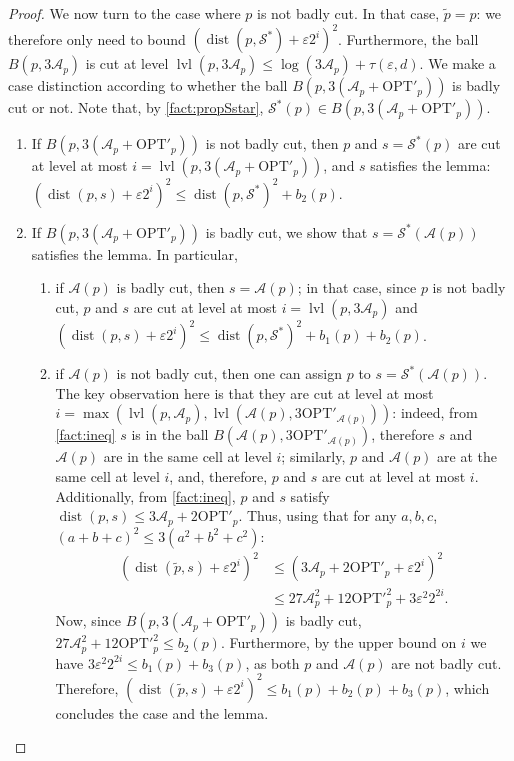 \documentclass[11pt]{article}
\newcommand{\opt}{\text{OPT}}
\newcommand{\eps}{\varepsilon}
\renewcommand{\tilde}{\widetilde}
\newcommand{\calS}{\mathcal {S}}
\newcommand{\calL}{\mathcal{A}}
\newcommand{\offset}{\tau(\eps, d)}
\DeclareMathOperator{\dist}{dist}
\newcommand{\lpar}{\left(}
\newcommand{\rpar}{\right)}
\DeclareMathOperator{\level}{lvl}
\begin{document}
\begin{proof}
 
 We now turn to the case where $p$ is not badly cut. In that case, $\tilde p = p$: we therefore only need to bound $\lpar \dist( p, \calS^*) + \eps 2^i\rpar^2$. 
 Furthermore, the ball $B(p, 3\calL_p)$ is cut at level $\level(p, 3\calL_p) \leq \log(3\calL_p)+\offset$. 
We make a case distinction according to whether the ball $B(p, 3(\calL_p + \opt'_p))$  is badly cut or not. Note that, by \cref{fact:propSstar}, $ \calS^*(p) \in B(p, 3(\calL_p + \opt'_p))$.
 \begin{enumerate}
  \item If $B(p, 3(\calL_p + \opt'_p))$ is not badly cut, then $p$ and $s = \calS^*(p)$ are cut at level at most $i = \level(p, 3(\calL_p + \opt'_p))$, and $s$ satisfies the lemma: $(\dist(p, s) + \eps 2^i)^2 \leq \dist(p, \calS^*)^2 + b_2(p)$.
  \item If $B(p, 3(\calL_p + \opt'_p))$ is badly cut, we show that $s= \calS^*(\calL(p))$ satisfies the lemma. In particular,
  \begin{enumerate}
      \item if $\calL(p)$ is badly cut, then $s = \calL(p)$; in that case, since $p$ is not badly cut, $p$ and $s$ are cut at level at most $i = \level(p, 3\calL_p)$ and $(\dist(p, s) + \eps 2^i)^2 \leq \dist(p, \calS^*)^2 + b_1(p) + b_2(p)$.
      \item if $\calL(p)$ is not badly cut, then one can assign $p$ to $s=\calS^*(\calL(p))$. The key observation here is that they are cut at level at most $i = \max\lpar \level(p, \calL_p), \level(\calL(p),  3\opt'_{\calL(p)}) \rpar$: indeed, from \cref{fact:ineq} $s$ is in the ball $B(\calL(p), 3\opt'_{\calL(p)})$, therefore $s$ and $\calL(p)$ are in the same cell at level $i$; similarly, $p$ and $\calL(p)$ are at the same cell at level $i$, and, therefore, $p$ and $s$ are cut at level at most $i$.  Additionally, from \cref{fact:ineq}, $p$ and $s$ satisfy $\dist(p, s) \leq 3\calL_p + 2\opt'_p$.    
 Thus, using that for any $a, b, c$, $(a+b+c)^2 \leq 3(a^2 + b^2 + c^2)$:
       \begin{align*}
           (\dist(\tilde p, s) + \eps 2^i)^2 &\leq 
           (3\calL_p + 2\opt'_p + \eps 2^i)^2\\
           &\leq 27 \calL_p^2 + 12 {\opt'}_p^2 + 3\eps^2 2^{2i}.
       \end{align*}
    Now, since $B(p, 3(\calL_p + \opt'_p))$ is badly cut, $27 \calL_p^2 + 12 {\opt'}_p^2 \leq b_2(p)$. Furthermore, by the upper bound on $i$ we have $3\eps^2 2^{2i} \leq b_1(p) + b_3(p)$, as both $p$ and $\calL(p)$ are not badly cut. 
    Therefore, $(\dist(\tilde p, s) + \eps 2^i)^2 \leq b_1(p)+ b_2(p) + b_3(p)$, which concludes the case and the lemma.\qedhere
  \end{enumerate}
\end{enumerate}
%
\end{proof}
\end{document}
